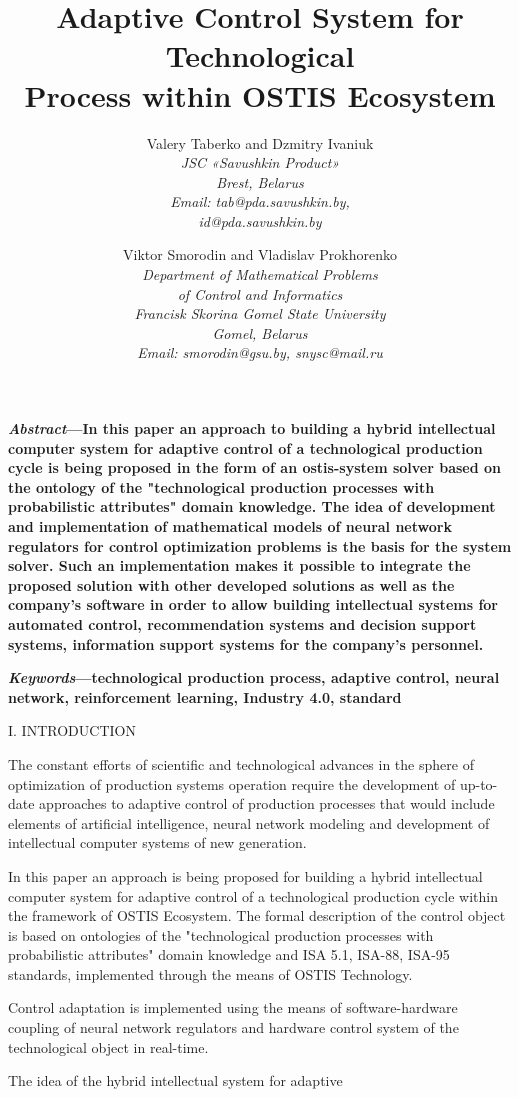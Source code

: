 \documentclass{article}
\title{\huge\bfseries Adaptive Control System for Technological \\ Process within OSTIS Ecosystem \\}
\author{
 Valery Taberko and Dzmitry Ivaniuk\\
 \itshape JSC «Savushkin Product»\\
 Brest, Belarus\\
 Email: tab@pda.savushkin.by,\\
 id@pda.savushkin.by\\ \and
 Viktor Smorodin and Vladislav Prokhorenko\\
\itshape Department of Mathematical Problems\\
\itshape of Control and Informatics\\
\itshape Francisk Skorina Gomel State University\\
 Gomel, Belarus\\
 Email: smorodin@gsu.by, snysc@mail.ru}\\
\date{}
\begin{document}
\maketitle  
\begin{multicols}{2}
\textbf{\small\textit{Abstract}—In this paper an approach to building a hybrid intellectual computer system for adaptive control of a
technological production cycle is being proposed in the
form of an ostis-system solver based on the ontology of
the "technological production processes with probabilistic
attributes" domain knowledge. The idea of development and
implementation of mathematical models of neural network
regulators for control optimization problems is the basis for
the system solver. Such an implementation makes it possible
to integrate the proposed solution with other developed
solutions as well as the company’s software in order to
allow building intellectual systems for automated control,
recommendation systems and decision support systems,
information support systems for the company’s personnel.} \par
\small\textbf{\textit{Keywords}—technological production process, adaptive
control, neural network, reinforcement learning, Industry 4.0, standard}\\
\begin{center}
    I. INTRODUCTION \\
\end{center}
\par The constant efforts of scientific and technological
advances in the sphere of optimization of production
systems operation require the development of up-to-date
approaches to adaptive control of production processes
that would include elements of artificial intelligence,
neural network modeling and development of intellectual
computer systems of new generation.
\par In this paper an approach is being proposed for building
a hybrid intellectual computer system for adaptive control
of a technological production cycle within the framework
of OSTIS Ecosystem. The formal description of the
control object is based on ontologies of the "technological
production processes with probabilistic attributes" domain
knowledge and ISA 5.1, ISA-88, ISA-95 standards,
implemented through the means of OSTIS Technology.
\par Control adaptation is implemented using the means of
software-hardware coupling of neural network regulators
and hardware control system of the technological object
in real-time.
\par The idea of the hybrid intellectual system for adaptive

\end{multicols}
\end{document}
